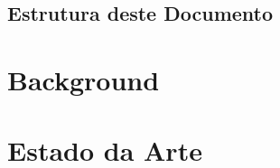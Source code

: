 \documentclass[a4paper]{book}
\begin{document}

	\section{Estrutura deste Documento}


\chapter{Background}

%

\chapter{Estado da Arte}

%
%
\end{document}

